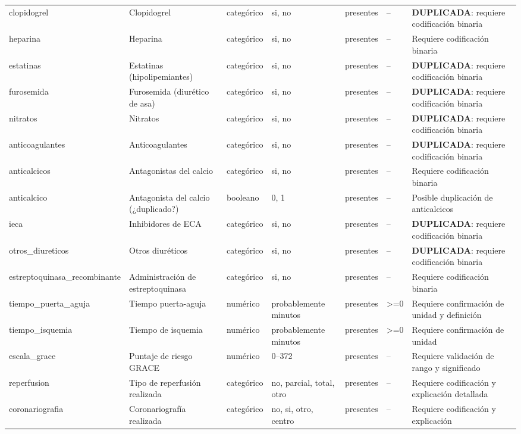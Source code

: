 \documentclass[11pt,a4paper]{article}
\begin{document}
\begin{longtable}{@{}L{0.095\textwidth} L{0.17\textwidth} L{0.07\textwidth} L{0.16\textwidth} L{0.14\textwidth} L{0.13\textwidth} L{0.15\textwidth}@{}}
clopidogrel & Clopidogrel & categórico & si, no & presentes & -- & \textbf{DUPLICADA}: requiere codificación binaria \\
heparina & Heparina & categórico & si, no & presentes & -- & Requiere codificación binaria \\
estatinas & Estatinas (hipolipemiantes) & categórico & si, no & presentes & -- & \textbf{DUPLICADA}: requiere codificación binaria \\
furosemida & Furosemida (diurético de asa) & categórico & si, no & presentes & -- & \textbf{DUPLICADA}: requiere codificación binaria \\
nitratos & Nitratos & categórico & si, no & presentes & -- & \textbf{DUPLICADA}: requiere codificación binaria \\
anticoagulantes & Anticoagulantes & categórico & si, no & presentes & -- & \textbf{DUPLICADA}: requiere codificación binaria \\
anticalcicos & Antagonistas del calcio & categórico & si, no & presentes & -- & Requiere codificación binaria \\
anticalcico & Antagonista del calcio (¿duplicado?) & booleano & 0, 1 & presentes & -- & Posible duplicación de anticalcicos \\
ieca & Inhibidores de ECA & categórico & si, no & presentes & -- & \textbf{DUPLICADA}: requiere codificación binaria \\
otros\_diureticos & Otros diuréticos & categórico & si, no & presentes & -- & \textbf{DUPLICADA}: requiere codificación binaria \\
estreptoquinasa\_recombinante & Administración de estreptoquinasa & categórico & si, no & presentes & -- & Requiere codificación binaria \\
tiempo\_puerta\_aguja & Tiempo puerta-aguja & numérico & probablemente minutos & presentes & >=0 & Requiere confirmación de unidad y definición \\
tiempo\_isquemia & Tiempo de isquemia & numérico & probablemente minutos & presentes & >=0 & Requiere confirmación de unidad \\
escala\_grace & Puntaje de riesgo GRACE & numérico & 0--372 & presentes & -- & Requiere validación de rango y significado \\
reperfusion & Tipo de reperfusión realizada & categórico & no, parcial, total, otro & presentes & -- & Requiere codificación y explicación detallada \\
coronariografia & Coronariografía realizada & categórico & no, si, otro, centro & presentes & -- & Requiere codificación y explicación \\

\end{longtable}
\end{document}
